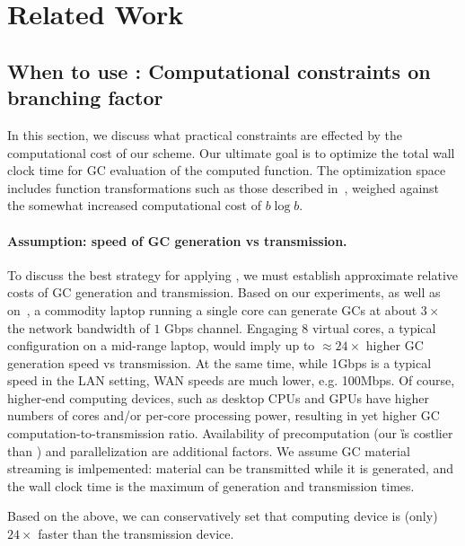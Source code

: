 \section{Related Work}\label{sec:relwork}

\subsection{When to use \ourscheme: Computational constraints on branching factor}

In this section, we discuss what practical constraints are effected by the computational cost of our scheme.  
Our ultimate goal is to optimize the total wall clock time for GC evaluation of the computed function.  The optimization space includes function transformations such as those described in~, weighed against the somewhat increased computational cost of $b\log b$.


\paragraph{Assumption: speed of GC generation vs transmission.}  To discuss the best strategy for applying \ourscheme, we must establish approximate relative costs of GC generation and transmission.  Based on our experiments, as well as on~\cite{XiaoPersonalComm}, a commodity laptop running a single core can generate GCs at about $3\times$ the network bandwidth of $1$ Gbps channel.  Engaging  $8$ virtual cores, a typical configuration on a mid-range laptop, would imply up to $\approx 24\times$ higher GC generation speed vs transmission.   At the same time, while 1Gbps is a typical speed in the LAN setting, WAN speeds are much lower, e.g. 100Mbps.  Of course, higher-end computing devices, such as desktop CPUs and GPUs have higher numbers of cores and/or per-core processing power, resulting in yet higher GC computation-to-transmission ratio.  Availability of precomputation (our \G is costlier than \E) and parallelization are additional factors.  We assume GC material streaming is imlpemented:  material can be transmitted while it is generated, and the wall clock time is the maximum of generation and transmission times.

Based on the above, we can conservatively set that computing device is (only) $24\times$ faster than the transmission device.




